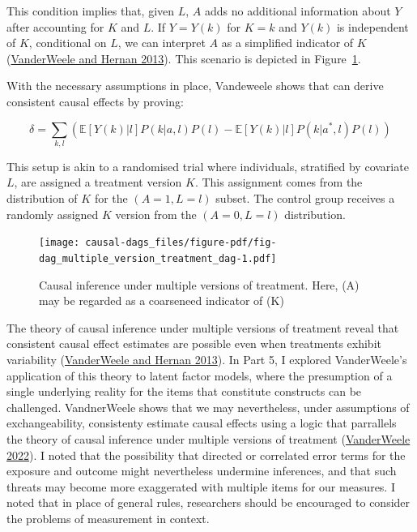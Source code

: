 \documentclass[
  singlecolumn]{article}
\begin{document}
This condition implies that, given \(L\), \(A\) adds no additional
information about \(Y\) after accounting for \(K\) and \(L\). If
\(Y = Y(k)\) for \(K = k\) and \(Y(k)\) is independent of \(K\),
conditional on \(L\), we can interpret \(A\) as a simplified indicator
of \(K\) (\protect\hyperlink{ref-vanderweele2013}{VanderWeele and Hernan
2013}). This scenario is depicted in
Figure~\ref{fig-dag_multiple_version_treatment_dag}.

With the necessary assumptions in place, Vandeweele shows that can
derive consistent causal effects by proving:

\[\delta = \sum_{k,l} \left( \mathbb{E}[Y(k)|l] P(k|a,l) P(l) - \mathbb{E}[Y(k)|l] P(k|a^*,l) P(l) \right) \]

This setup is akin to a randomised trial where individuals, stratified
by covariate \(L\), are assigned a treatment version \(K\). This
assignment comes from the distribution of \(K\) for the
\((A = 1, L = l)\) subset. The control group receives a randomly
assigned \(K\) version from the \((A = 0, L = l)\) distribution.

\begin{figure}

{\centering \texttt{[image: causal-dags\_files/figure-pdf/fig-dag\_multiple\_version\_treatment\_dag-1.pdf]}

}

\caption{\label{fig-dag_multiple_version_treatment_dag}Causal inference
under multiple versions of treatment. Here, (A) may be regarded as a
coarseneed indicator of (K)}

\end{figure}

The theory of causal inference under multiple versions of treatment
reveal that consistent causal effect estimates are possible even when
treatments exhibit variability
(\protect\hyperlink{ref-vanderweele2013}{VanderWeele and Hernan 2013}).
In Part 5, I explored VanderWeele's application of this theory to latent
factor models, where the presumption of a single underlying reality for
the items that constitute constructs can be challenged. VandnerWeele
shows that we may nevertheless, under assumptions of exchangeability,
consistenty estimate causal effects using a logic that parrallels the
theory of causal inference under multiple versions of treatment
(\protect\hyperlink{ref-vanderweele2022}{VanderWeele 2022}). I noted
that the possibility that directed or correlated error terms for the
exposure and outcome might nevertheless undermine inferences, and that
such threats may become more exaggerated with multiple items for our
measures. I noted that in place of general rules, researchers should be
encouraged to consider the problems of measurement in context.
\end{document}
